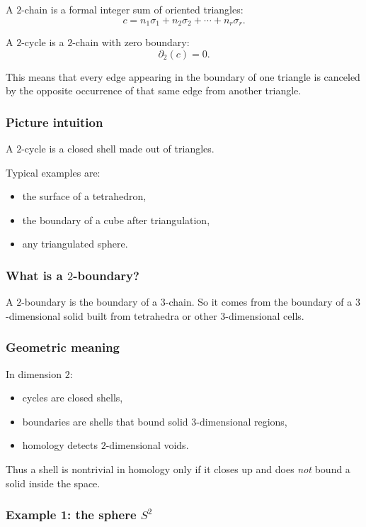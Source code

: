 \documentclass[12pt,a4paper]{article}
\theoremstyle{notespace}
\begin{document}
A \(2\)-chain is a formal integer sum of oriented triangles:
\[
c=n_1\sigma_1+n_2\sigma_2+\cdots+n_r\sigma_r.
\]

A \(2\)-cycle is a \(2\)-chain with zero boundary:
\[
\partial_2(c)=0.
\]

This means that every edge appearing in the boundary of one triangle is canceled by the opposite occurrence of that same edge from another triangle.

\subsubsection*{Picture intuition}

A \(2\)-cycle is a closed shell made out of triangles.

Typical examples are:
\begin{itemize}
	\item the surface of a tetrahedron,
	\item the boundary of a cube after triangulation,
	\item any triangulated sphere.
\end{itemize}

\subsubsection*{What is a \(2\)-boundary?}

A \(2\)-boundary is the boundary of a \(3\)-chain. So it comes from the boundary of a \(3\)-dimensional solid built from tetrahedra or other \(3\)-dimensional cells.

\subsubsection*{Geometric meaning}

In dimension \(2\):
\begin{itemize}
	\item cycles are closed shells,
	\item boundaries are shells that bound solid \(3\)-dimensional regions,
	\item homology detects \(2\)-dimensional voids.
\end{itemize}

Thus a shell is nontrivial in homology only if it closes up and does \emph{not} bound a solid inside the space.

\subsubsection*{Example 1: the sphere \(S^2\)}
\end{document}
